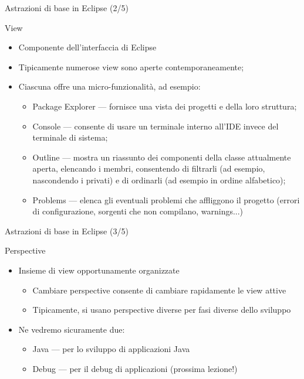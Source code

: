 \documentclass[presentation]{beamer}
\begin{document}
\begin{frame}{Astrazioni di base in Eclipse (2/5)}
\begin{block}{View}
\begin{itemize}
\item Componente dell'interfaccia di Eclipse
\item Tipicamente numerose view sono aperte contemporaneamente;
\item Ciascuna offre una micro-funzionalità, ad esempio:
\begin{itemize}
\item Package Explorer --- fornisce una vista dei progetti e della loro struttura;
\item Console --- consente di usare un terminale interno all'IDE invece del terminale di sistema;
\item Outline --- mostra un riassunto dei componenti della classe attualmente aperta, elencando i membri, consentendo di filtrarli (ad esempio, nascondendo i privati) e di ordinarli (ad esempio in ordine alfabetico);
\item Problems --- elenca gli eventuali problemi che affliggono il progetto (errori di configurazione, sorgenti che non compilano, warnings...)
\end{itemize}
\end{itemize}
\end{block}
\end{frame}

\begin{frame}{Astrazioni di base in Eclipse (3/5)}
\begin{block}{Perspective}
\begin{itemize}
\item Insieme di view opportunamente organizzate
\begin{itemize}
\item Cambiare perspective consente di cambiare rapidamente le view attive
\item Tipicamente, si usano perspective diverse per fasi diverse dello sviluppo
\end{itemize}
\item Ne vedremo sicuramente due:
\begin{itemize}
\item Java --- per lo sviluppo di applicazioni Java
\item Debug --- per il debug di applicazioni (prossima lezione!)
\end{itemize}
\end{itemize}
\end{block}
\end{frame}
\end{document}
